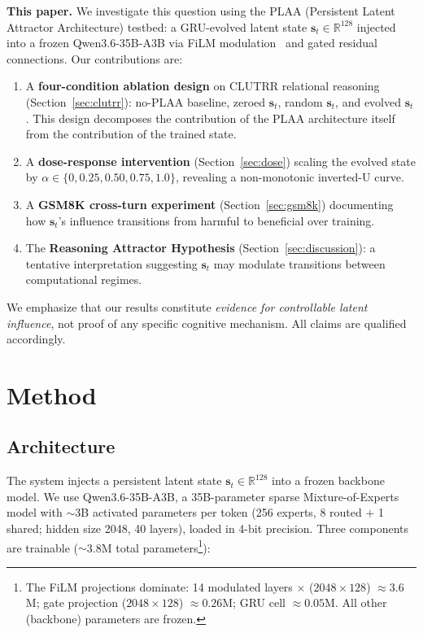 \documentclass[11pt,a4paper]{article}
\begin{document}
\textbf{This paper.} We investigate this question using the PLAA (Persistent Latent Attractor Architecture) testbed: a GRU-evolved latent state $\mathbf{s}_t \in \mathbb{R}^{128}$ injected into a frozen Qwen3.6-35B-A3B via FiLM modulation~\cite{perez2018film} and gated residual connections. Our contributions are:

\begin{enumerate}
    \item A \textbf{four-condition ablation design} on CLUTRR relational reasoning (Section~\ref{sec:clutrr}): no-PLAA baseline, zeroed $\mathbf{s}_t$, random $\mathbf{s}_t$, and evolved $\mathbf{s}_t$. This design decomposes the contribution of the PLAA architecture itself from the contribution of the trained state.
    \item A \textbf{dose-response intervention} (Section~\ref{sec:dose}) scaling the evolved state by $\alpha \in \{0, 0.25, 0.50, 0.75, 1.0\}$, revealing a non-monotonic inverted-U curve.
    \item A \textbf{GSM8K cross-turn experiment} (Section~\ref{sec:gsm8k}) documenting how $\mathbf{s}_t$'s influence transitions from harmful to beneficial over training.
    \item The \textbf{Reasoning Attractor Hypothesis} (Section~\ref{sec:discussion}): a tentative interpretation suggesting $\mathbf{s}_t$ may modulate transitions between computational regimes.
\end{enumerate}

We emphasize that our results constitute \textit{evidence for controllable latent influence}, not proof of any specific cognitive mechanism. All claims are qualified accordingly.

\section{Method}

\subsection{Architecture}

The system injects a persistent latent state $\mathbf{s}_t \in \mathbb{R}^{128}$ into a frozen backbone model. We use Qwen3.6-35B-A3B, a 35B-parameter sparse Mixture-of-Experts model with $\sim$3B activated parameters per token (256 experts, 8 routed $+$ 1 shared; hidden size 2048, 40 layers), loaded in 4-bit precision. Three components are trainable ($\sim$3.8M total parameters\footnote{The FiLM projections dominate: 14 modulated layers $\times$ ($2048 \times 128$) $\approx 3.6$M; gate projection ($2048 \times 128$) $\approx 0.26$M; GRU cell $\approx 0.05$M. All other (backbone) parameters are frozen.}):
\end{document}
